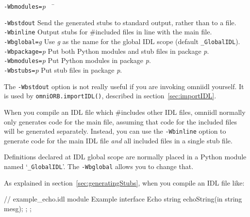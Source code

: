 \documentclass[draft,11pt,twoside,a4paper]{book}
\newcommand{\module}[1]{\texttt{#1}}
\newcommand{\op}[1]{\texttt{#1()}}
\newcommand{\cmdline}[1]{\texttt{#1}}
\begin{document}
\begin{tabbing}

\cmdline{-Wbmodules=}\textit{p}~~ \= \kill

\cmdline{-Wbstdout}
     \> Send the generated stubs to standard output, rather than to a
        file.\\

\cmdline{-Wbinline}
     \> Output stubs for \#included files in line with the main
        file.\\

\cmdline{-Wbglobal=}\textit{g}
     \> Use \textit{g} as the name for the global IDL scope (default
        \module{\_GlobalIDL}).\\

\cmdline{-Wbpackage=}\textit{p}
     \> Put both Python modules and stub files in package
        \textit{p}.\\

\cmdline{-Wbmodules=}\textit{p}
     \> Put Python modules in package \textit{p}.\\

\cmdline{-Wbstubs=}\textit{p}
     \> Put stub files in package \textit{p}.\\

\end{tabbing}


The \cmdline{-Wbstdout} option is not really useful if you are
invoking omniidl yourself. It is used by \op{omniORB.importIDL},
described in section~\ref{sec:importIDL}.

When you compile an IDL file which \#includes other IDL files, omniidl
normally only generates code for the main file, assuming that code for
the included files will be generated separately. Instead, you can use
the \cmdline{-Wbinline} option to generate code for the main IDL file
\emph{and} all included files in a single stub file.

Definitions declared at IDL global scope are normally placed in a
Python module named `\module{\_GlobalIDL}'. The \cmdline{-Wbglobal}
allows you to change that.


As explained in section~\ref{sec:generatingStubs}, when you compile an
IDL file like:

\begin{idllisting}
// example_echo.idl
module Example {
  interface Echo {
    string echoString(in string mesg);
  };
};
\end{idllisting}
\end{document}
